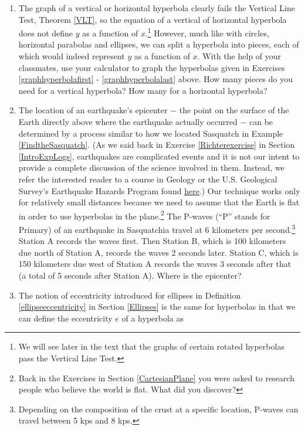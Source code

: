 \begin{enumerate}

\setcounter{enumi}{\value{HW}}

\item The graph of a vertical or horizontal hyperbola clearly fails the Vertical Line Test, Theorem \ref{VLT}, so the equation of a vertical of horizontal hyperbola does not define $y$ as a function of $x$.\footnote{We will see later in the text that the graphs of certain rotated hyperbolas pass the Vertical Line Test.}  However, much like with circles, horizontal parabolas and ellipses, we can split a hyperbola into pieces, each of which would indeed represent $y$ as a function of $x$.  With the help of your classmates, use your calculator to graph the hyperbolas given in Exercises \ref{graphhyperbolafirst} - \ref{graphhyperbolalast} above.  How many pieces do you need for a vertical hyperbola?  How many for a horizontal hyperbola?  


\item The location of an earthquake's epicenter $-$ the point on the surface of the Earth directly above where the earthquake actually occurred $-$ can be determined by a process similar to how we located Sasquatch in Example \ref{FindtheSasquatch}.  (As we said back in Exercise \ref{Richterexercise} in Section \ref{IntroExpLogs}, earthquakes are complicated events and it is not our intent to provide a complete discussion of the science involved in them.  Instead, we refer the interested reader to a course in Geology or the U.S. Geological Survey's Earthquake Hazards Program found \href{http://earthquake.usgs.gov/}{\underline{here}}.)  Our technique works only for relatively small distances because we need to assume that the Earth is flat in order to use hyperbolas in the plane.\footnote{Back in the Exercises in Section \ref{CartesianPlane} you were asked to research people who believe the world is flat.  What did you discover?}  The P-waves (``P'' stands for Primary) of an earthquake in Sasquatchia travel at 6 kilometers per second.\footnote{Depending on the composition of the crust at a specific location, P-waves can travel between 5 kps and 8 kps.}  Station A records the waves first. Then Station B, which is 100 kilometers due north of Station A, records the waves 2 seconds later.  Station C, which is 150 kilometers due west of Station A records the waves 3 seconds after that (a total of 5 seconds after Station A). Where is the epicenter?

\item \label{hyperbolaeccentricity} The notion of eccentricity introduced for ellipses in Definition \ref{ellipseeccentricity} in Section \ref{Ellipses} is the same for hyperbolas in that we can define the eccentricity $e$ of a hyperbola as 


\end{enumerate}
